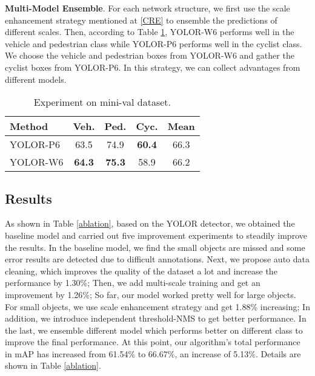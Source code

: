 \documentclass[final]{cvpr}
\begin{document}
\noindent\textbf{Multi-Model Ensemble}. For each network structure, we first use the scale enhancement strategy mentioned at \ref{CRE} to ensemble the predictions of different scales. Then, according to Table \ref{P6vsW6}, YOLOR-W6 performs well in the vehicle and pedestrian class while YOLOR-P6 performs well in the cyclist class. We choose the vehicle and pedestrian boxes from YOLOR-W6 and gather the cyclist boxes from YOLOR-P6. In this strategy, we can collect advantages from different models.

\begin{table}[h]
\begin{center}
\caption{Experiment on mini-val dataset.}
\begin{tabular}{l|c|c|c|c}
\hline
Method  & Veh. & Ped. & Cyc. & Mean \\
\hline
YOLOR-P6 & 63.5 & 74.9 & \textbf{60.4} &  66.3 \\
YOLOR-W6 & \textbf{64.3} & \textbf{75.3} & 58.9 & 66.2 \\
\hline
\end{tabular}
\label{P6vsW6}
\end{center}
\end{table}

\subsection{Results}
As shown in Table \ref{ablation}, based on the YOLOR detector, we obtained the baseline model and carried out five improvement experiments to steadily improve the results. In the baseline model, we find the small objects are missed and some error results are detected due to difficult annotations. Next, we propose auto data cleaning, which improves the quality of the dataset a lot and increase the performance by 1.30\%; Then, we add multi-scale training and get an improvement by 1.26\%;
So far, our model worked pretty well for large objects. For small objects, we use scale enhancement strategy and get 1.88\% increasing; In addition, we introduce independent threshold-NMS to get better performance. In the last, we ensemble different model which performs better on different class to improve the final performance. At this point, our algorithm’s total performance in mAP has increased from 61.54\% to 66.67\%, an increase of 5.13\%. Details are shown in Table \ref{ablation}.
\end{document}
